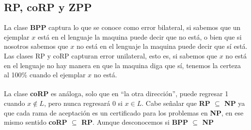 \documentclass[12pt,letterpaper]{article}
\begin{document}




\subsection*{RP, coRP y ZPP}

La clase \textbf{BPP} captura lo que se conoce como error bilateral, si sabemos que un ejemplar $x$ está en el lenguaje la maquina puede decir que no está, o bien que
si nosotros sabemos que $x$ no está en el lenguaje la maquina puede decir que sí está.
\newpage
Las clases RP y coRP capturan error unilateral, esto es, 
si sabemos que $x$ no está en el lenguaje no hay manera en que la maquina diga que sí, tenemos la certeza al 100\% cuando el ejemplar $x$ no está.\\

\\

La clase \textbf{coRP} es análoga, solo que en ``la otra dirección'', puede regresar 1 cuando $x \not \in L$, pero nunca regresará $0$ si $x \in L$. Cabe señalar que \textbf{RP $\subseteq$ NP} ya que cada rama de aceptación es un certificado para los problemas en \textbf{NP}, en ese mismo sentido \textbf{coRP $\subseteq$ RP}. Aunque desconocemos si \textbf{BPP $\subseteq$ NP}
\end{document}
